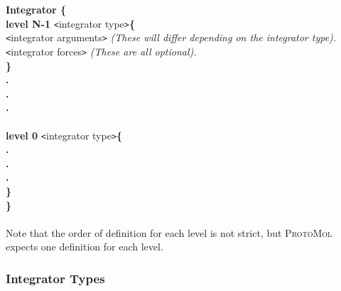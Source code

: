 \documentclass[11pt]{report}
\newcommand{\ProtoMol}{\textsc{ProtoMol }}
\newcommand{\tempstart}{\texttt{<}}
\newcommand{\tempend}{\texttt{>}}
\begin{document}
\clearpage
{\bf Integrator \{}\\
{\bf \indent \indent level N-1} \tempstart integrator type\tempend  {\bf \{}\\
{\indent \indent \indent \tempstart integrator arguments\tempend }
{\it (These will differ depending on the integrator type). }\\
{ \indent \indent \indent \tempstart integrator forces\tempend }
{\it (These are all optional). }\\
{\bf \indent \indent \} }\\
{\bf \indent \indent .}\\
{\bf \indent \indent .}\\
{\bf \indent \indent .}\\
\\
{\bf \indent \indent level 0} \tempstart integrator type\tempend  {\bf \{}\\
{\bf \indent \indent \indent .}\\
{\bf \indent \indent \indent .}\\
{\bf \indent \indent \indent .}\\
{\bf \indent \indent \} }\\
{\bf \indent \}}\\ \\

Note that the order of definition for each level is not strict, but
\ProtoMol expects one definition for each level.

\subsubsection{Integrator Types}
\end{document}
